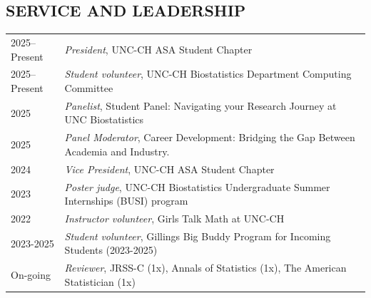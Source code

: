 \documentclass[11pt]{scrartcl}
\begin{document}
{\subsection{\MakeUppercase{Service and Leadership}}
\noindent
{\def\arraystretch{1.2}\tabcolsep=0pt
\begin{longtable}{p{0.15\linewidth}p{0.85\linewidth}}

    2025--Present & \textit{President}, UNC-CH ASA Student Chapter \\

    2025--Present  & \textit{Student volunteer}, UNC-CH Biostatistics Department Computing Committee\\

    2025 & \textit{Panelist}, Student Panel: Navigating your Research Journey at UNC Biostatistics \\

    2025 & \textit{Panel Moderator}, Career Development: Bridging the Gap Between Academia and Industry. \\

    2024 & \textit{Vice President}, UNC-CH ASA Student Chapter \\

    2023 & \textit{Poster judge}, UNC-CH Biostatistics Undergraduate Summer Internships (BUSI) program \\

    2022 & \textit{Instructor volunteer}, Girls Talk Math at UNC-CH \\

    2023-2025 & \textit{Student} \textit{volunteer}, Gillings Big Buddy Program for Incoming Students (2023-2025) \\
    
    On-going & \textit{Reviewer}, JRSS-C (1x), Annals of Statistics (1x), The American Statistician (1x)\\
\end{longtable}%
}


}
\end{document}
